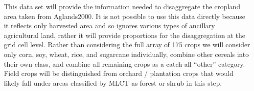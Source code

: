This data set will provide the information needed to disaggregate the
cropland area taken from Aglands2000.  It is not possible to use this
data directly because it reflects only harvested area and so ignores
various types of ancillary agricultural land, rather it will provide
proportions for the disaggregation at the grid cell level.  Rather
than considering the full array of 175 crops we will consider only
corn, soy, wheat, rice, and sugarcane individually, combine other
cereals into their own class, and combine all remaining crops as a
catch-all ``other'' category.  Field crops will be distinguished from
orchard / plantation crops that would likely fall under areas
classified by MLCT as forest or shrub in this step.


